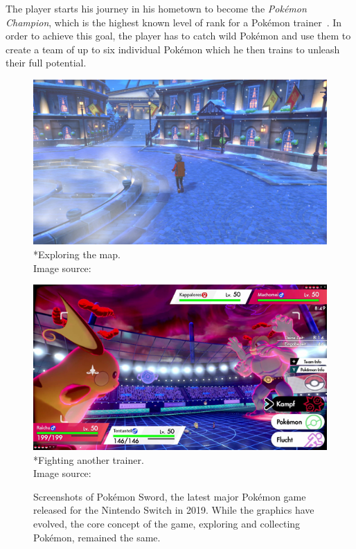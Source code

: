The player starts his journey in his hometown to become the \textit{Pokémon Champion}, which is the highest known 
level of rank for a Pokémon trainer~\autocite{Bulbapedia:Pokémon-Champion}. In order
to achieve this goal, the player has to catch wild Pokémon and use them to create a team of up to six individual 
Pokémon which he then trains to unleash their full potential. 
\begin{figure}
  \centering
  \begin{minipage}{.5\textwidth}
    \centering
    \includegraphics[width=.95\linewidth]{images/Sword-0.jpg}
    \captionsetup{margin=0.5cm}
    *{Exploring the map.\\Image source:~\autocite{Pokemon:SwordMap}}
  \end{minipage}%
  \begin{minipage}{.5\textwidth}
    \centering
    \includegraphics[width=.95\linewidth]{images/Sword-1.jpg}
    \captionsetup{margin=0.5cm}
    *{Fighting another trainer. \\Image source:~\autocite{Nintendo:PokemonSchwert}}
  \end{minipage}
  \caption{Screenshots of Pokémon Sword, the latest major Pokémon game released for the Nintendo Switch in 2019. While the graphics have 
  evolved, the core concept of the game, exploring and collecting Pokémon, remained the same.}
  \label{fig:screenshot-sword}
\end{figure}
